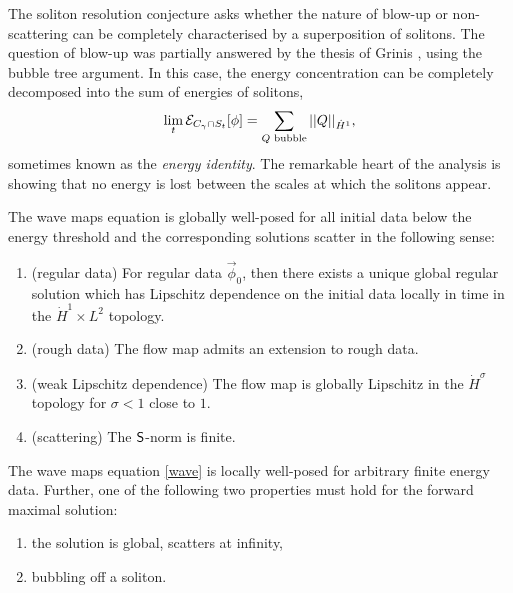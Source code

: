 \begin{remark}
	The soliton resolution conjecture asks whether the nature of blow-up or non-scattering can be completely characterised by a superposition of solitons. The question of blow-up was partially answered by the thesis of Grinis \cite{Grinis2016}, using the bubble tree argument. In this case, the energy concentration can be completely decomposed into the sum of energies of solitons,
		\[
			\lim_{t} \mathcal E_{C_\gamma \cap S_t} [\phi] = \sum_{Q \text{ bubble}} ||Q||_{\dot H^1}, 
		\]
	 sometimes known as the \emph{energy identity}. The remarkable heart of the analysis is showing that no energy is lost between the scales at which the solitons appear.  
\end{remark}

\begin{theorem}
	The wave maps equation is globally well-posed for all initial data below the energy threshold and the corresponding solutions scatter in the following sense:
	\begin{enumerate}
		\item (regular data) For regular data $\vec \phi_0$, then there exists a unique global regular solution which has Lipschitz dependence on the initial data locally in time in the $\dot H^1 \times L^2$ topology. 
		
		\item (rough data) The flow map admits an extension to rough data. 
		
		\item (weak Lipschitz dependence) The flow map is globally Lipschitz in the $\dot H^{\sigma}$ topology for $\sigma < 1$ close to $1$. 
		
		\item (scattering) The $\mathsf S$-norm is finite.
	\end{enumerate}	
\end{theorem}

\begin{theorem}
	The wave maps equation \eqref{wave} is locally well-posed for arbitrary finite energy data. Further, one of the following two properties must hold for the forward maximal solution:
	\begin{enumerate}
		\item the solution is global, scatters at infinity,
		\item bubbling off a soliton. 
	\end{enumerate}
\end{theorem}

